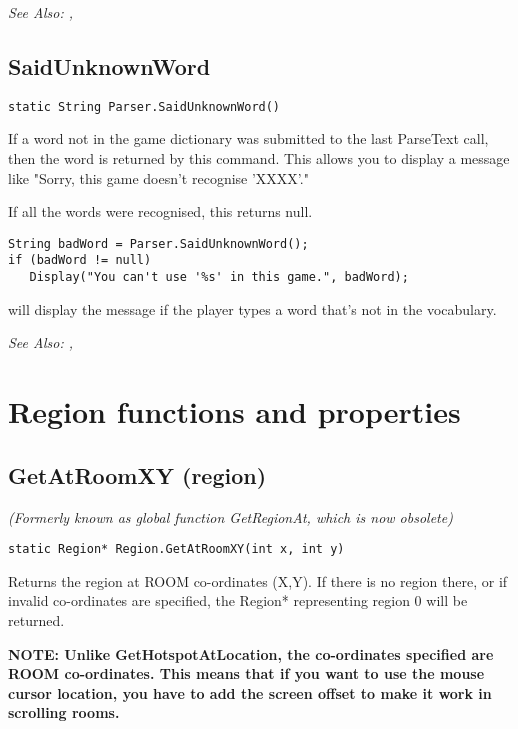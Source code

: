 \it{See Also:} , 


\subsection{SaidUnknownWord}\label{Parser.SaidUnknownWord}%

\begin{verbatim}
static String Parser.SaidUnknownWord()
\end{verbatim}
If a word not in the game dictionary was submitted to the last ParseText
call, then the word is returned by this command. This allows you to display a
message like "Sorry, this game doesn't recognise 'XXXX'."

If all the words were recognised, this returns null.

\begin{verbatim}
String badWord = Parser.SaidUnknownWord();
if (badWord != null)
   Display("You can't use '%s' in this game.", badWord);
\end{verbatim}
will display the message if the player types a word that's not in the vocabulary.

\it{See Also:} , 


\section{Region functions and properties}%


\subsection{GetAtRoomXY (region)}\label{Region.GetAtRoomXY}%

\it{(Formerly known as global function GetRegionAt, which is now obsolete)}

\begin{verbatim}
static Region* Region.GetAtRoomXY(int x, int y)
\end{verbatim}
Returns the region at ROOM co-ordinates (X,Y).
If there is no region there, or if invalid co-ordinates are specified,
the Region* representing region 0 will be returned.

\bf{NOTE:} Unlike GetHotspotAtLocation, the co-ordinates specified are ROOM co-ordinates. This
means that if you want to use the mouse cursor location, you have to add the
screen offset to make it work in scrolling rooms.

